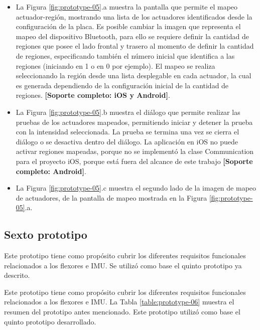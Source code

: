 \begin{itemize}

\item La Figura \ref{fig:prototype-05}.a muestra la pantalla que permite el mapeo actuador-región, mostrando una lista de los actuadores identificados desde la configuración de la placa. Es posible cambiar la imagen que representa el mapeo del dispositivo Bluetooth, para ello se requiere definir la cantidad de regiones que posee el lado frontal y trasero al momento de definir la cantidad de regiones, especificando también el número inicial que identifica a las regiones (iniciando en 1 o en 0 por ejemplo). El mapeo se realiza seleccionando la región desde una lista desplegable en cada actuador, la cual es generada dependiendo de la configuración inicial de la cantidad de regiones. \textbf{[Soporte completo: iOS y Android]}.

\item La Figura \ref{fig:prototype-05}.b muestra el diálogo que permite realizar las pruebas de los actuadores mapeados, permitiendo iniciar y detener la prueba con la intensidad seleccionada. La prueba se termina una vez se cierra el diálogo o se desactiva dentro del diálogo. La aplicación en iOS no puede activar regiones mapeadas, porque no se implementó la clase Communication para el proyecto iOS, porque está fuera del alcance de este trabajo \textbf{[Soporte completo: Android]}.

\item La Figura \ref{fig:prototype-05}.c muestra el segundo lado de la imagen de mapeo de actuadores, de la pantalla de mapeo mostrada en la Figura \ref{fig:prototype-05}.a.

\end{itemize}




\subsection{Sexto  prototipo}
\label{sexto-prototipo}
Este prototipo tiene como propósito cubrir los diferentes requisitos funcionales relacionados a los flexores e IMU. Se utilizó como base el quinto prototipo ya descrito. 

Este prototipo tiene como propósito cubrir los diferentes requisitos funcionales relacionados a los flexores e IMU.  La Tabla \ref{table:prototype-06} muestra el resumen del prototipo antes mencionado. Este prototipo utilizó como base el quinto prototipo desarrollado.

